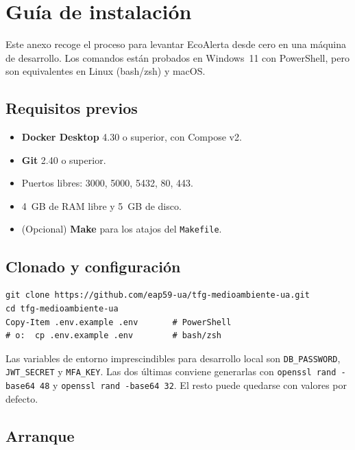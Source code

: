 \chapter{Guía de instalación}
\label{app:instalacion}

Este anexo recoge el proceso para levantar EcoAlerta desde cero en una máquina de desarrollo. Los comandos están probados en Windows~11 con PowerShell, pero son equivalentes en Linux (bash/zsh) y macOS.


\section*{Requisitos previos}

\begin{itemize}[leftmargin=1.2cm, itemsep=2pt]
  \item \textbf{Docker Desktop} 4.30 o superior, con Compose v2.
  \item \textbf{Git} 2.40 o superior.
  \item Puertos libres: 3000, 5000, 5432, 80, 443.
  \item 4~GB de RAM libre y 5~GB de disco.
  \item (Opcional) \textbf{Make} para los atajos del \texttt{Makefile}.
\end{itemize}


\section*{Clonado y configuración}

\begin{lstlisting}[basicstyle=\ttfamily\small, frame=single, backgroundcolor=\color{gray!5}]
git clone https://github.com/eap59-ua/tfg-medioambiente-ua.git
cd tfg-medioambiente-ua
Copy-Item .env.example .env       # PowerShell
# o:  cp .env.example .env        # bash/zsh
\end{lstlisting}

Las variables de entorno imprescindibles para desarrollo local son \texttt{DB\_PASSWORD}, \texttt{JWT\_SECRET} y \texttt{MFA\_KEY}. Las dos últimas conviene generarlas con \texttt{openssl rand -base64 48} y \texttt{openssl rand -base64 32}. El resto puede quedarse con valores por defecto.


\section*{Arranque}


